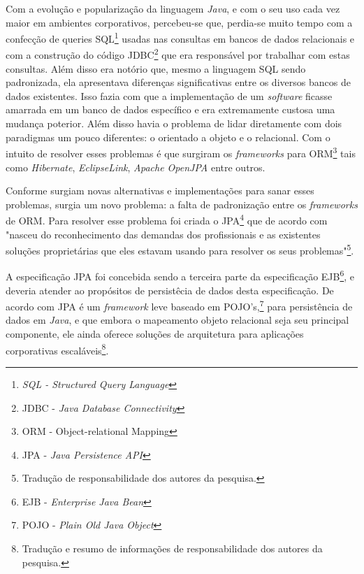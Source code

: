
	\par Com a evolução e popularização da linguagem \textit{Java}, e com o seu
uso cada vez maior em ambientes corporativos, percebeu-se que, perdia-se muito
tempo com a confecção de queries SQL\footnote{\textit{SQL - Structured Query
Language}} usadas nas consultas em bancos de dados relacionais e com a
construção do código JDBC\footnote{JDBC - \textit{Java Database Connectivity}}
que era responsável por trabalhar com estas consultas. Além disso era notório
que, mesmo a linguagem SQL sendo padronizada, ela apresentava diferenças
significativas entre os diversos bancos de dados existentes. Isso fazia com que
a implementação de um \textit{software} ficasse amarrada em um banco de dados
específico e era extremamente custosa uma mudança poterior. Além disso havia o
problema de lidar diretamente com dois paradigmas um pouco diferentes: o
orientado a objeto e o relacional. Com o intuito de resolver esses problemas é
que surgiram os \textit{frameworks} para ORM\footnote{ORM - Object-relational
Mapping} tais como \textit{Hibernate}, \textit{EclipseLink}, \textit{Apache
OpenJPA} entre outros.

	\par Conforme surgiam novas alternativas e implementações para sanar esses
problemas, surgia um novo problema: a falta de padronização entre os
\textit{frameworks} de ORM. Para resolver esse problema foi criada o
JPA\footnote{JPA - \textit{Java Persistence API}} que de acordo com
 "nasceu do reconhecimento das demandas dos
profissionais e as existentes soluções proprietárias que eles estavam usando
para resolver os seus problemas"\footnote{Tradução de responsabilidade dos
autores da pesquisa.}. 
	
	\par A especificação JPA foi concebida sendo a terceira parte da
especificação EJB\footnote{EJB - \textit{Enterprise Java Bean}}, e deveria
atender ao propósitos de persistêcia de dados desta especificação.
De acordo com  JPA é um \textit{framework} leve
baseado em POJO's,\footnote{POJO - \textit{Plain Old Java Object }} para
persistência de dados em \textit{Java}, e que embora o mapeamento objeto
relacional seja seu principal componente, ele ainda oferece soluções de
arquitetura para aplicações corporativas escaláveis\footnote{Tradução e resumo
de informações de responsabilidade dos autores da pesquisa.}.

